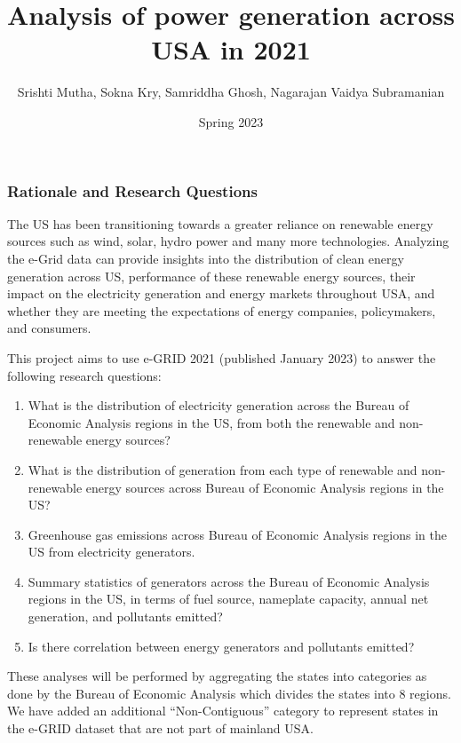 \documentclass[
]{article}
\title{Analysis of power generation across USA in 2021}
\author{Srishti Mutha, Sokna Kry, Samriddha Ghosh, Nagarajan Vaidya
Subramanian}
\date{Spring 2023}
\providecommand{\tightlist}{%
  \setlength{\itemsep}{0pt}\setlength{\parskip}{0pt}}
\begin{document}
\maketitle

\tableofcontents 
\newpage
\listoftables 
\newpage
\listoffigures 
\newpage

\hypertarget{rationale-and-research-questions}{%
\subsubsection{Rationale and Research
Questions}\label{rationale-and-research-questions}}

The US has been transitioning towards a greater reliance on renewable
energy sources such as wind, solar, hydro power and many more
technologies. Analyzing the e-Grid data can provide insights into the
distribution of clean energy generation across US, performance of these
renewable energy sources, their impact on the electricity generation and
energy markets throughout USA, and whether they are meeting the
expectations of energy companies, policymakers, and consumers.

This project aims to use e-GRID 2021 (published January 2023) to answer
the following research questions:

\begin{enumerate}
\def\labelenumi{\arabic{enumi}.}
\tightlist
\item
  What is the distribution of electricity generation across the Bureau
  of Economic Analysis regions in the US, from both the renewable and
  non-renewable energy sources?
\item
  What is the distribution of generation from each type of renewable and
  non-renewable energy sources across Bureau of Economic Analysis
  regions in the US?
\item
  Greenhouse gas emissions across Bureau of Economic Analysis regions in
  the US from electricity generators.
\item
  Summary statistics of generators across the Bureau of Economic
  Analysis regions in the US, in terms of fuel source, nameplate
  capacity, annual net generation, and pollutants emitted?
\item
  Is there correlation between energy generators and pollutants emitted?
\end{enumerate}

These analyses will be performed by aggregating the states into
categories as done by the Bureau of Economic Analysis which divides the
states into 8 regions. We have added an additional ``Non-Contiguous''
category to represent states in the e-GRID dataset that are not part of
mainland USA.
\end{document}
